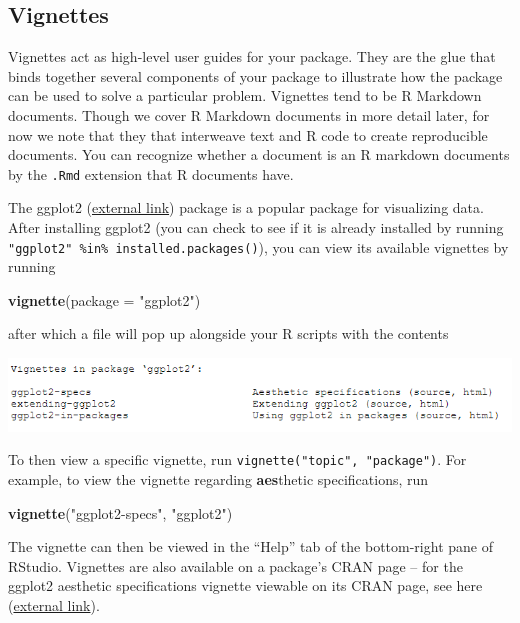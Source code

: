 \documentclass[
]{book}
\newenvironment{Shaded}{\begin{snugshade}}{\end{snugshade}}
\newcommand{\DataTypeTok}[1]{\textcolor[rgb]{0.13,0.29,0.53}{#1}}
\newcommand{\KeywordTok}[1]{\textcolor[rgb]{0.13,0.29,0.53}{\textbf{#1}}}
\newcommand{\NormalTok}[1]{#1}
\newcommand{\StringTok}[1]{\textcolor[rgb]{0.31,0.60,0.02}{#1}}
\begin{document}
\hypertarget{vignettes}{%
\subsection{Vignettes}\label{vignettes}}

Vignettes act as high-level user guides for your package. They are the glue that binds together several components of your package to illustrate how the package can be used to solve a particular problem. Vignettes tend to be R Markdown documents. Though we cover R Markdown documents in more detail later, for now we note that they that interweave text and R code to create reproducible documents. You can recognize whether a document is an R markdown documents by the \texttt{.Rmd} extension that R documents have.

The ggplot2 (\href{https://ggplot2.tidyverse.org/}{external link}) package is a popular package for visualizing data. After installing ggplot2 (you can check to see if it is already installed by running \texttt{"ggplot2"\ \%in\%\ installed.packages()}), you can view its available vignettes by running

\begin{Shaded}
\begin{Highlighting}[]
\KeywordTok{vignette}\NormalTok{(}\DataTypeTok{package =} \StringTok{"ggplot2"}\NormalTok{)}
\end{Highlighting}
\end{Shaded}

after which a file will pop up alongside your R scripts with the contents

\includegraphics[width=1\linewidth]{images/newrpack_files6}

To then view a specific vignette, run \texttt{vignette("topic",\ "package")}. For example, to view the vignette regarding \textbf{aes}thetic specifications, run

\begin{Shaded}
\begin{Highlighting}[]
\KeywordTok{vignette}\NormalTok{(}\StringTok{"ggplot2-specs"}\NormalTok{, }\StringTok{"ggplot2"}\NormalTok{)}
\end{Highlighting}
\end{Shaded}

The vignette can then be viewed in the ``Help'' tab of the bottom-right pane of RStudio. Vignettes are also available on a package's CRAN page -- for the ggplot2 aesthetic specifications vignette viewable on its CRAN page, see here (\href{https://cran.r-project.org/web/packages/ggplot2/vignettes/ggplot2-specs.html}{external link}).
\end{document}
